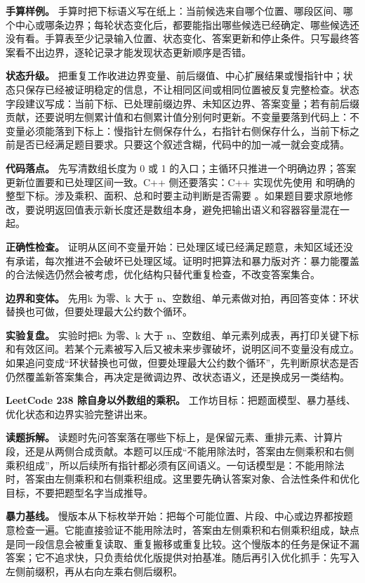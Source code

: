 \textbf{手算样例。} 手算时把下标语义写在纸上：当前候选来自哪个位置、哪段区间、哪个中心或哪条边界；每轮状态变化后，都要能指出哪些候选已经确定、哪些候选还没有看。手算表至少记录输入位置、状态变化、答案更新和停止条件。只写最终答案看不出边界，逐轮记录才能发现状态更新顺序是否错。

\textbf{状态升级。} 把重复工作收进边界变量、前后缀值、中心扩展结果或慢指针中；状态只保存已经被证明稳定的信息，不让相同区间或相同位置被反复完整检查。状态字段建议写成：当前下标、已处理前缀边界、未知区边界、答案变量；若有前后缀贡献，还要说明左侧累计值和右侧累计值分别何时更新。不变量要落到代码上：不变量必须能落到下标上：慢指针左侧保存什么，右指针右侧保存什么，当前下标之前是否已经满足题目要求。只要这个叙述含糊，代码中的加一减一就会变成猜。

\textbf{代码落点。} 先写清数组长度为 0 或 1 的入口；主循环只推进一个明确边界；答案更新位置要和已处理区间一致。C++ 侧还要落实：C++ 实现优先使用  和明确的整型下标。涉及乘积、面积、总和时要主动判断是否需要 。如果题目要求原地修改，要说明返回值表示新长度还是数组本身，避免把输出语义和容器容量混在一起。

\textbf{正确性检查。} 证明从区间不变量开始：已处理区域已经满足题意，未知区域还没有承诺，每次推进不会破坏已处理区域。证明时把算法和暴力版对齐：暴力能覆盖的合法候选仍然会被考虑，优化结构只替代重复检查，不改变答案集合。

\textbf{边界和变体。} 先用k 为零、k 大于 n、空数组、单元素做对拍，再回答变体：环状替换也可做，但要处理最大公约数个循环。

\textbf{实验复盘。} 实验时把k 为零、k 大于 n、空数组、单元素列成表，再打印关键下标和有效区间。若某个元素被写入后又被未来步骤破坏，说明区间不变量没有成立。如果追问变成“环状替换也可做，但要处理最大公约数个循环”，先判断原状态是否仍然覆盖新答案集合，再决定是微调边界、改状态语义，还是换成另一类结构。

\noindent\textbf{LeetCode 238 除自身以外数组的乘积。} 工作坊目标：把题面模型、暴力基线、优化状态和边界实验完整讲出来。

\textbf{读题拆解。} 读题时先问答案落在哪些下标上，是保留元素、重排元素、计算片段，还是从两侧合成贡献。本题可以压成“不能用除法时，答案由左侧乘积和右侧乘积组成”，所以后续所有指针都必须有区间语义。一句话模型是：不能用除法时，答案由左侧乘积和右侧乘积组成。这里要先确认答案对象、合法性条件和优化目标，不要把题型名字当成推导。

\textbf{暴力基线。} 慢版本从下标枚举开始：把每个可能位置、片段、中心或边界都按题意检查一遍。它能直接验证不能用除法时，答案由左侧乘积和右侧乘积组成，缺点是同一段信息会被重复读取、重复搬移或重复比较。这个慢版本的任务是保证不漏答案；它不追求快，只负责给优化版提供对拍基准。随后再引入优化抓手：先写入左侧前缀积，再从右向左乘右侧后缀积。

